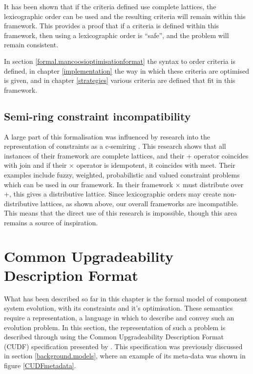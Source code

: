 It has been shown that if the criteria defined use complete lattices, the lexicographic order can be used and the resulting criteria will remain within this framework. 
This provides a proof that if a criteria is defined within this framework, then using a lexicographic order is ``safe'', and the problem will remain consistent.

In section \ref{formal.mancoosioptimisationformat} the syntax to order criteria is defined, 
in chapter \ref{implementation} the way in which these criteria are optimised is given,
and in chapter \ref{strategies} various criteria are defined that fit in this framework.

\subsection{Semi-ring constraint incompatibility}
A large part of this formalisation was influenced by research into the representation of constraints as a c-semiring \cite{Bistarelli1997}.
This research shows that all instances of their framework are complete lattices, and their $+$ operator coincides with join
and if their $\times$ operator is idempotent, it coincides with meet.
Their examples include fuzzy, weighted, probabilistic and valued constraint problems which can be used in our framework.
In their framework $\times$ must distribute over $+$, this gives a distributive lattice.
Since lexicographic orders may create non-distributive lattices, as shown above, our overall frameworks are incompatible.
This means that the direct use of this research is impossible, though this area remains a source of inspiration.

\section{Common Upgradeability Description Format}
\label{formal.cudf}
What has been described so far in this chapter is the formal model of component system evolution, with its constraints and it's optimisation.
These semantics require a representation, a language in which to describe and convey such an evolution problem.
In this section, the representation of such a problem is described through using the Common Upgradeability Description Format (CUDF) specification presented by \cite{treinen2009common}.
This specification was previously discussed in section \ref{background.models}, where an example of its meta-data was shown in figure \ref{CUDFmetadata}.

